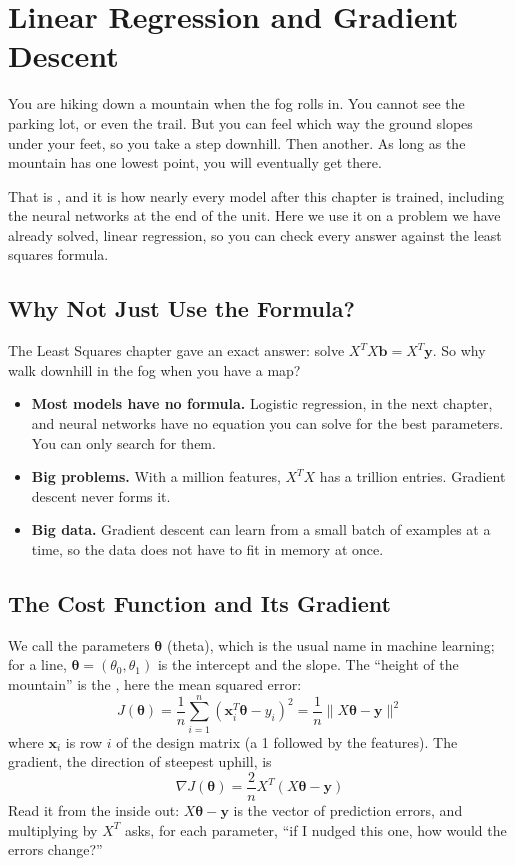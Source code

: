 \chapter{Linear Regression and Gradient Descent}

You are hiking down a mountain when the fog rolls in. You cannot see the parking lot, or even the trail. But
you can feel which way the ground slopes under your feet, so you take a step downhill. Then another. As long as
the mountain has one lowest point, you will eventually get there.

That is , and it is how nearly every model after this chapter
is trained, including the neural networks at the end of the unit. Here we use it on a problem we have already
solved, linear regression, so you can check every answer against the least squares formula.

\section{Why Not Just Use the Formula?}
The Least Squares chapter gave an exact answer: solve $X^T X \mathbf{b} = X^T \mathbf{y}$. So why walk
downhill in the fog when you have a map?
\begin{itemize}
\item \textbf{Most models have no formula.} Logistic regression, in the next chapter, and neural networks have
no equation you can solve for the best parameters. You can only search for them.
\item \textbf{Big problems.} With a million features, $X^T X$ has a trillion entries. Gradient descent
never forms it.
\item \textbf{Big data.} Gradient descent can learn from a small batch of examples at a time, so the data does
not have to fit in memory at once.
\end{itemize}

\section{The Cost Function and Its Gradient}
We call the parameters $\boldsymbol{\theta}$ (theta), which is the usual name in machine learning; for a line,
$\boldsymbol{\theta} = (\theta_0, \theta_1)$ is the intercept and the slope. The ``height of the mountain'' is the
, here the mean squared error:
$$J(\boldsymbol{\theta}) = \frac{1}{n}\sum_{i=1}^n (\mathbf{x}_i^T\boldsymbol{\theta} - y_i)^2
= \frac{1}{n}\|X\boldsymbol{\theta} - \mathbf{y}\|^2$$
where $\mathbf{x}_i$ is row $i$ of the design matrix (a 1 followed by the features). The gradient, the
direction of steepest uphill, is
$$\nabla J(\boldsymbol{\theta}) = \frac{2}{n} X^T(X\boldsymbol{\theta} - \mathbf{y})$$
Read it from the inside out: $X\boldsymbol{\theta} - \mathbf{y}$ is the vector of prediction errors, and
multiplying by $X^T$ asks, for each parameter, ``if I nudged this one, how would the errors change?''

